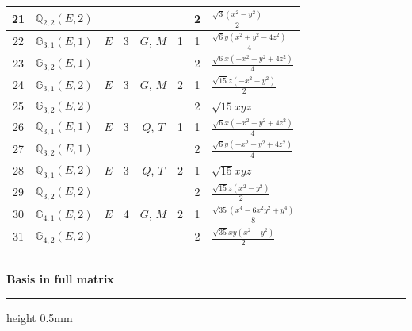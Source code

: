 \documentclass[fleqn,10pt,landscape]{jsarticle}
\begin{document}
\begin{longtable}[l]{clcccccl}
21 & $\mathbb{Q}_{2,2}(E,2)$ &  &  &  &  & 2 & $\frac{\sqrt{3} \left(x^{2} - y^{2}\right)}{2}$ \\ \hline
22 & $\mathbb{G}_{3,1}(E,1)$ & $E$ & 3 & $G$, $M$ & 1 & 1 & $\frac{\sqrt{6} y \left(x^{2} + y^{2} - 4 z^{2}\right)}{4}$ \\
23 & $\mathbb{G}_{3,2}(E,1)$ &  &  &  &  & 2 & $\frac{\sqrt{6} x \left(- x^{2} - y^{2} + 4 z^{2}\right)}{4}$ \\ \hline
24 & $\mathbb{G}_{3,1}(E,2)$ & $E$ & 3 & $G$, $M$ & 2 & 1 & $\frac{\sqrt{15} z \left(- x^{2} + y^{2}\right)}{2}$ \\
25 & $\mathbb{G}_{3,2}(E,2)$ &  &  &  &  & 2 & $\sqrt{15} x y z$ \\ \hline
26 & $\mathbb{Q}_{3,1}(E,1)$ & $E$ & 3 & $Q$, $T$ & 1 & 1 & $\frac{\sqrt{6} x \left(- x^{2} - y^{2} + 4 z^{2}\right)}{4}$ \\
27 & $\mathbb{Q}_{3,2}(E,1)$ &  &  &  &  & 2 & $\frac{\sqrt{6} y \left(- x^{2} - y^{2} + 4 z^{2}\right)}{4}$ \\ \hline
28 & $\mathbb{Q}_{3,1}(E,2)$ & $E$ & 3 & $Q$, $T$ & 2 & 1 & $\sqrt{15} x y z$ \\
29 & $\mathbb{Q}_{3,2}(E,2)$ &  &  &  &  & 2 & $\frac{\sqrt{15} z \left(x^{2} - y^{2}\right)}{2}$ \\ \hline
30 & $\mathbb{G}_{4,1}(E,2)$ & $E$ & 4 & $G$, $M$ & 2 & 1 & $\frac{\sqrt{35} \left(x^{4} - 6 x^{2} y^{2} + y^{4}\right)}{8}$ \\
31 & $\mathbb{G}_{4,2}(E,2)$ &  &  &  &  & 2 & $\frac{\sqrt{35} x y \left(x^{2} - y^{2}\right)}{2}$ \\
\end{longtable}
\vspace{5mm}
\noindent \rule[0.5mm]{5mm}{0.5mm}\hspace{3mm}\textbf{Basis in full matrix}\hspace{3mm}\leaders\hrule height 0.5mm\hfill\kern0pt
\vspace{3mm}
\end{document}
